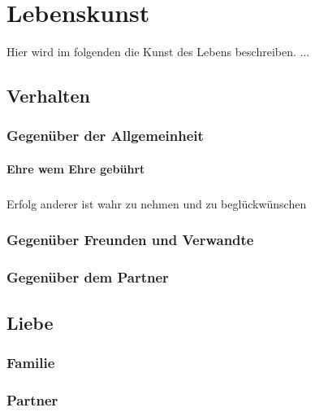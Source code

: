 \chapter{Lebenskunst} 
    \begin{thesis_quotation}
    \end{thesis_quotation}
    
    Hier wird im folgenden die Kunst des Lebens beschreiben. ...
      
    \section{Verhalten}
        \subsection{Gegenüber der Allgemeinheit}
            \subsubsection{Ehre wem Ehre gebührt}
                \paragraph{} Erfolg anderer ist wahr zu nehmen und zu beglückwünschen
        \subsection{Gegenüber Freunden und Verwandte}        
        \subsection{Gegenüber dem Partner}
    \section{Liebe}
        \subsection{Familie}
        \subsection{Partner}
            
    
